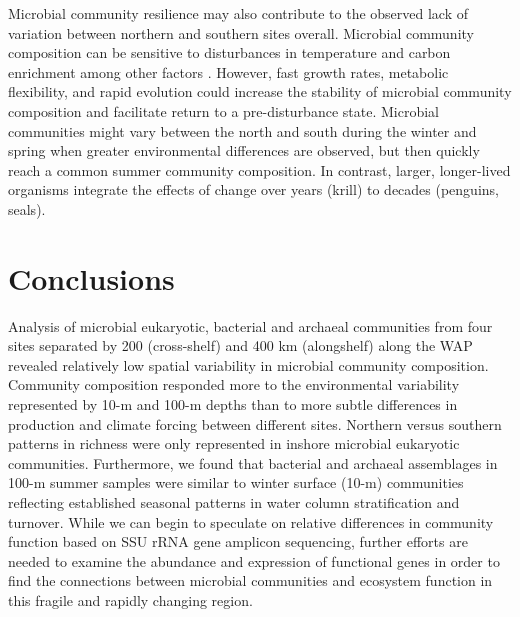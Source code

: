 Microbial community resilience may also contribute to the observed lack of variation between northern and southern sites overall. Microbial community composition can be sensitive to disturbances in temperature and carbon enrichment among other factors \citep{am08}. However, fast growth rates, metabolic flexibility, and rapid evolution could increase the stability of microbial community composition and facilitate return to a pre-disturbance state. Microbial communities might vary between the north and south during the winter and spring when greater environmental differences are observed, but then quickly reach a common summer community composition. In contrast, larger, longer-lived organisms integrate the effects of change over years (krill) to decades (penguins, seals).

\section{Conclusions}\label{conclusions}

Analysis of microbial eukaryotic, bacterial and archaeal communities from four sites separated by 200 (cross-shelf) and 400 km (alongshelf) along the WAP revealed relatively low spatial variability in microbial community composition. Community composition responded more to the environmental variability represented by 10-m and 100-m depths than to more subtle differences in production and climate forcing between different sites. Northern versus southern patterns in richness were only represented in inshore microbial eukaryotic communities. Furthermore, we found that bacterial and archaeal assemblages in 100-m summer samples were similar to winter surface (10-m) communities reflecting established seasonal patterns in water column stratification and turnover. While we can begin to speculate on relative differences in community function based on SSU rRNA gene amplicon sequencing, further efforts are needed to examine the abundance and expression of functional genes in order to find the connections between microbial communities and ecosystem function in this fragile and rapidly changing region.

